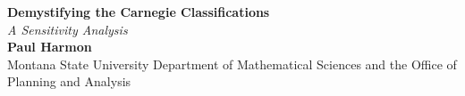 \documentclass[a0,portrait]{a0poster}
\begin{document}
 



\begin{minipage}[b]{0.99\linewidth}
	\centering
\veryHuge \color{NavyBlue} \textbf{Demystifying the Carnegie Classifications} \color{Black}\\ %
\Huge\textit{A Sensitivity Analysis}\\[2cm] %
\huge \textbf{Paul Harmon}\\[0.5cm] %
\huge Montana State University Department of Mathematical Sciences and the Office of Planning and Analysis\\[0.4cm] %

\end{minipage}
%
%
\vspace{1cm} %

\end{document}
